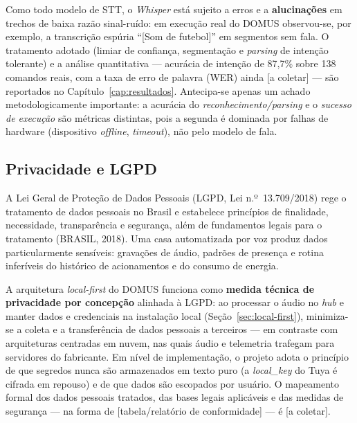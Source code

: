 Como todo modelo de STT, o \textit{Whisper} está sujeito a erros e a
\textbf{alucinações} em trechos de baixa razão sinal-ruído: em execução real do
DOMUS observou-se, por exemplo, a transcrição espúria ``[Som de futebol]'' em
segmentos sem fala. O tratamento adotado (limiar de confiança, segmentação e
\textit{parsing} de intenção tolerante) e a análise quantitativa --- acurácia de
intenção de 87,7\% sobre 138 comandos reais, com a taxa de erro de palavra (WER)
ainda [a coletar] --- são reportados no
Capítulo~\ref{cap:resultados}. Antecipa-se apenas um achado metodologicamente
importante: a acurácia do \textit{reconhecimento/parsing} e o \textit{sucesso de
execução} são métricas distintas, pois a segunda é dominada por falhas de hardware
(dispositivo \textit{offline}, \textit{timeout}), não pelo modelo de fala.

\subsection{Privacidade e LGPD}\label{sec:privacidade}

A Lei Geral de Proteção de Dados Pessoais (LGPD, Lei n.º~13.709/2018) rege o
tratamento de dados pessoais no Brasil e estabelece princípios de finalidade,
necessidade, transparência e segurança, além de fundamentos legais para o
tratamento (BRASIL, 2018). Uma casa automatizada por voz produz dados
particularmente sensíveis: gravações de áudio, padrões de presença e rotina
inferíveis do histórico de acionamentos e do consumo de energia.

A arquitetura \textit{local-first} do DOMUS funciona como \textbf{medida técnica de
privacidade por concepção} alinhada à LGPD: ao processar o áudio no \textit{hub} e
manter dados e credenciais na instalação local (Seção~\ref{sec:local-first}),
minimiza-se a coleta e a transferência de dados pessoais a terceiros --- em contraste
com arquiteturas centradas em nuvem, nas quais áudio e telemetria trafegam para
servidores do fabricante. Em nível de implementação, o projeto adota o princípio de
que segredos nunca são armazenados em texto puro (a \textit{local\_key} do Tuya é
cifrada em repouso) e de que dados são escopados por usuário. O mapeamento formal
dos dados pessoais tratados, das bases legais aplicáveis e das medidas de segurança
--- na forma de [tabela/relatório de conformidade] --- é [a coletar].


